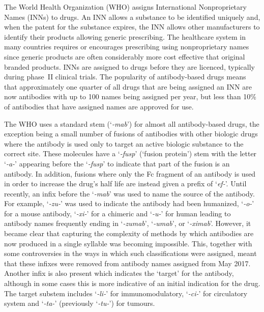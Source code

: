 \documentclass{article}
\newcommand{\eg}[1]{\mbox{`\emph{#1}'}}
\begin{document}
The World Health Organization (WHO) assigns International
Nonproprietary Names (INNs) to drugs. An INN allows a substance to be
identified uniquely and, when the patent for the substance expires,
the INN allows other manufacturers to identify their products allowing
generic prescribing. The healthcare system in many countries requires
or encourages prescribing using nonproprietary names since generic
products are often considerably more cost effective that original
branded products. INNs are assigned to drugs before they are licenced,
typically during phase~II clinical trials. The popularity of
antibody-based drugs means that approximately one quarter of all drugs
that are being assigned an INN are now antibodies with up to 100 names
being assigned per year, but less than 10\% of antibodies that have
assigned names are approved for use.

The WHO uses a standard stem (\eg{-mab}) for almost all antibody-based
drugs, the exception being a small number of fusions of antibodies
with other biologic drugs where the antibody is used only to target an
active biologic substance to the correct site. These molecules have a
\eg{-fusp} (`fusion protein') stem with the letter \eg{-a-} appearing
before the \eg{-fusp} to indicate that part of the fusion is an
antibody. In addition, fusions where only the Fc fragment of an
antibody is used in order to increase the drug's half life are instead
given a prefix of \eg{ef-}. Until recently, an infix before the
\eg{-mab} was used to name the source of the antibody. For example,
\eg{-zu-} was used to indicate the antibody had been humanized,
\eg{-o-} for a mouse antibody, \eg{-xi-} for a chimeric and \eg{-u-}
for human\cite{inn:stembook} leading to antibody names frequently
ending in \eg{-zumab}, \eg{-umab}, or \eg{-ximab}. However, it became
clear that capturing the complexity of methods by which antibodies are
now produced in a single syllable was becoming impossible. This,
together with some controversies in the ways in which such
classifications were assigned, meant that these infixes were removed
from antibody names assigned from May
2017\cite{inn:2017scheme,parren:names2017}. Another infix is also
present which indicates the `target' for the antibody, although in
some cases this is more indicative of an initial indication for the
drug. The target substem includes \eg{-li-} for immunomodulatory,
\eg{-ci-} for circulatory system and \eg{-ta-} (previously \eg{-tu-})
for tumours.
\end{document}
